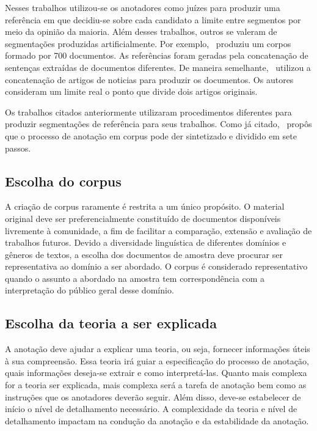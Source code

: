 Nesses trabalhos utilizou-se os anotadores como juízes para produzir uma referência em que decidiu-se sobre cada candidato a limite entre segmentos por meio da opinião da maioria. Além desses trabalhos, outros se valeram de segmentações produzidas artificialmente. Por exemplo,~\cite{Choi2000a} produziu um corpos formado por 700 documentos. As referências foram geradas pela concatenação de sentenças extraídas de documentos diferentes. De maneira semelhante,~\cite{CHAIBI2014} utilizou a concatenação de artigos de noticias para produzir os documentos. Os autores consideram um limite real o ponto que divide dois artigos originais. 



Os trabalhos citados anteriormente utilizaram procedimentos diferentes para produzir segmentações de referência para seus trabalhos. Como já citado,~\cite{Hovy2010} propôs que o processo de anotação em corpus pode der sintetizado e dividido em sete passos. 


\subsection{Escolha do corpus}
A criação de corpus raramente é restrita a um único propósito. O material original deve ser preferencialmente constituído de documentos disponíveis livremente à comunidade, a fim de facilitar a comparação, extensão e avaliação de trabalhos futuros. 
Devido a diversidade linguística de diferentes domínios e gêneros de textos, a escolha dos documentos de amostra deve procurar ser representativa ao domínio a ser abordado. O corpus é considerado representativo quando o assunto a abordado na amostra tem correspondência com a interpretação do público geral desse domínio.

\subsection{Escolha da teoria a ser explicada}
A anotação deve ajudar a explicar uma teoria, ou seja, fornecer informações úteis à sua compreensão. Essa teoria irá guiar a especificação do processo de anotação, quais informações deseja-se extrair e como interpretá-las. Quanto mais complexa for a teoria ser explicada, mais complexa será a tarefa de anotação bem como as instruções que os anotadores deverão seguir. Além disso, deve-se estabelecer de início o nível de detalhamento necessário. 
A complexidade da teoria e nível de detalhamento impactam na condução da anotação e da estabilidade da anotação.

